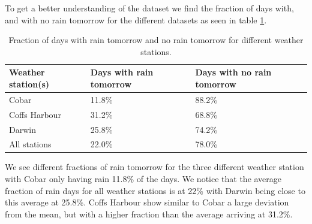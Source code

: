 \documentclass[11pt]{article}
\begin{document}
To get a better understanding of the dataset we find the fraction of days with, and with no rain tomorrow for the different datasets as seen in table \ref{tab:frac}.
\begin{table}[H]
    \begin{small}
        \caption{Fraction of days with rain tomorrow and no rain tomorrow for different weather stations.}
        \label{tab:frac}
        \begin{center}
            \begin{tabular}{|l|l|l|}
                \hline
                \textbf{Weather station(s)} & \textbf{Days with rain tomorrow} & \textbf{Days with no rain tomorrow} \\
                \hline
                Cobar                       & 11.8\%                           & 88.2\%                              \\
                \hline
                Coffs Harbour               & 31.2\%                           & 68.8\%                              \\
                \hline
                Darwin                      & 25.8\%                           & 74.2\%                              \\
                \hline
                All stations                & 22.0\%                           & 78.0\%                              \\
                \hline
            \end{tabular}
        \end{center}
    \end{small}
\end{table}
We see different fractions of rain tomorrow for the three different weather station with Cobar only having rain 11.8\% of the days. We notice that the average fraction of rain days for all weather stations is at 22\% with Darwin being close to this average at 25.8\%. Coffs Harbour show similar to Cobar a large deviation from the mean, but with a higher fraction than the average arriving at 31.2\%.
\end{document}
